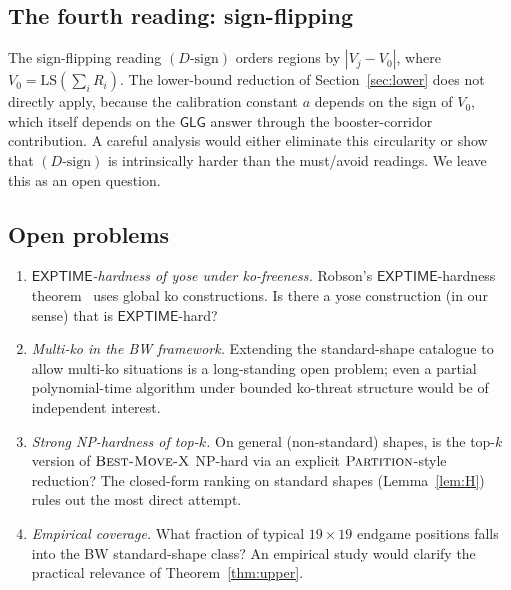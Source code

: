 \documentclass[11pt,a4paper]{amsart}
\theoremstyle{definition}
\theoremstyle{remark}
\newcommand{\LS}{\mathrm{LS}}
\newcommand{\GLG}{\mathsf{GLG}}
\newcommand{\BMX}{\textsc{Best-Move-X}}
\begin{document}
\subsection{The fourth reading: sign-flipping}

The sign-flipping reading $(D\text{-sign})$ orders regions by
$|V_j - V_0|$, where $V_0 = \LS(\sum_i R_i)$. The lower-bound reduction of
Section~\ref{sec:lower} does not directly apply, because the calibration
constant $a$ depends on the sign of $V_0$, which itself depends on the
$\GLG$ answer through the booster-corridor contribution. A careful
analysis would either eliminate this circularity or show that
$(D\text{-sign})$ is intrinsically harder than the must/avoid readings.
We leave this as an open question.

\subsection{Open problems}

\begin{enumerate}[label=\arabic*.]
\item \emph{$\mathsf{EXPTIME}$-hardness of yose under ko-freeness.}
  Robson's $\mathsf{EXPTIME}$-hardness theorem~\cite{Robson1983} uses
  global ko constructions. Is there a yose construction (in our sense)
  that is $\mathsf{EXPTIME}$-hard?
\item \emph{Multi-ko in the BW framework.} Extending the standard-shape
  catalogue to allow multi-ko situations is a long-standing open
  problem; even a partial polynomial-time algorithm under bounded
  ko-threat structure would be of independent interest.
\item \emph{Strong NP-hardness of top-$k$.} On general (non-standard)
  shapes, is the top-$k$ version of $\BMX$ NP-hard via an explicit
  $\textsc{Partition}$-style reduction? The closed-form ranking on
  standard shapes (Lemma~\ref{lem:H}) rules out the most direct attempt.
\item \emph{Empirical coverage.} What fraction of typical $19 \times 19$
  endgame positions falls into the BW standard-shape class? An empirical
  study would clarify the practical relevance of Theorem~\ref{thm:upper}.
\end{enumerate}
\end{document}
